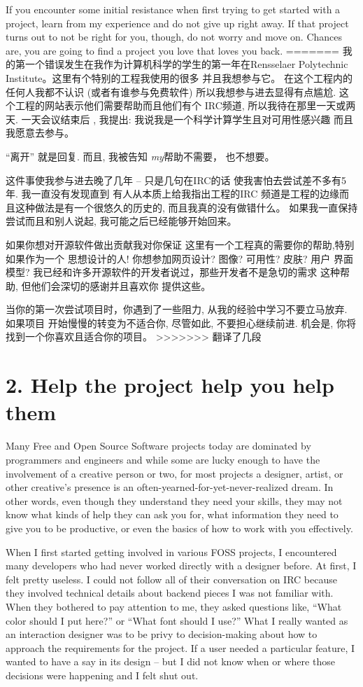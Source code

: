 If you encounter some initial resistance when first trying to get started with a
project, learn from my experience and do not give up right away. If that project
turns out to not be right for you, though, do not worry and move on. Chances are,
you are going to find a project you love that loves you back.
=======
我的第一个错误发生在我作为计算机科学的学生的第一年在Rensselaer Polytechnic Institute。这里有个特别的工程我使用的很多
并且我想参与它。 在这个工程内的任何人我都不认识 (或者有谁参与免费软件) 所以我想参与进去显得有点尴尬. 这个工程的网站表示他们需要帮助而且他们有个
IRC频道, 所以我待在那里一天或两天. 一天会议结束后
, 我提出: 我说我是一个科学计算学生且对可用性感兴趣
而且我愿意去参与。

``离开'' 就是回复. 而且, 我被告知 \emph{my}帮助不需要，
也不想要。

这件事使我参与进去晚了几年 -- 只是几句在IRC的话
使我害怕去尝试差不多有5年.  我一直没有发现直到
有人从本质上给我指出工程的IRC
频道是工程的边缘而且这种做法是有一个很悠久的历史的,
 而且我真的没有做错什么。 如果我一直保持
尝试而且和别人说起, 我可能之后已经能够开始回来。

如果你想对开源软件做出贡献我对你保证
这里有一个工程真的需要你的帮助,特别如果作为一个
思想设计的人! 你想参加网页设计? 图像? 可用性? 皮肤? 用户
界面模型? 我已经和许多开源软件的开发者说过，那些开发者不是急切的需求
这种帮助, 但他们会深切的感谢并且喜欢你
提供这些。

当你的第一次尝试项目时，你遇到了一些阻力, 从我的经验中学习不要立马放弃. 如果项目
开始慢慢的转变为不适合你, 尽管如此, 不要担心继续前进. 机会是,
你将找到一个你喜欢且适合你的项目。
>>>>>>> 翻译了几段

\section*{2. Help the project help you help them}

Many Free and Open Source Software projects today are dominated by programmers and
engineers and while some are lucky enough to have the involvement of a creative
person or two, for most projects a designer, artist, or other creative's
presence is an often-yearned-for-yet-never-realized dream. In other words, even
though they understand they need your skills, they may not know what kinds of
help they can ask you for, what information they need to give you to be
productive, or even the basics of how to work with you effectively. 

When I first started getting involved in various FOSS projects, I encountered
many developers who had never worked directly with a designer before. At first,
I felt pretty useless. I could not follow all of their conversation on IRC
because they involved technical details about backend pieces I was not familiar
with. When they bothered to pay attention to me, they asked questions like,
``What color should I put here?'' or ``What font should I use?'' What I really
wanted as an interaction designer was to be privy to decision-making about how
to approach the requirements for the project. If a user needed a particular
feature, I wanted to have a say in its design -- but I did not know when or where those decisions were happening and I felt shut out.

